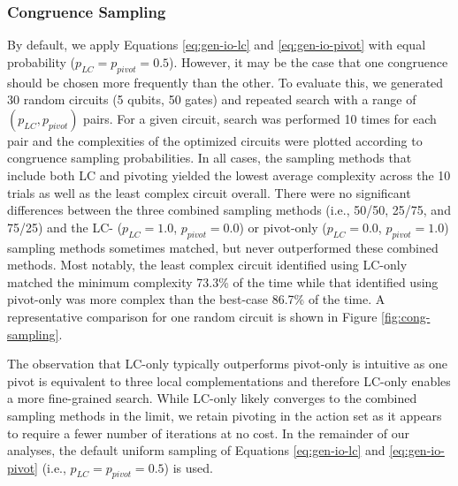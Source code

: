 \subsubsection*{Congruence Sampling}

By default, we apply Equations \ref{eq:gen-io-lc} and \ref{eq:gen-io-pivot} with equal probability ($p_{LC} = p_{pivot} = 0.5$).
However, it may be the case that one congruence should be chosen more frequently than the other.
To evaluate this, we generated 30 random circuits (5 qubits, 50 gates) and repeated search with a range of $(p_{LC}, p_{pivot})$ pairs.
For a given circuit, search was performed 10 times for each pair and the complexities of the optimized circuits were plotted according to congruence sampling probabilities.
In all cases, the sampling methods that include both LC and pivoting yielded the lowest average complexity across the 10 trials as well as the least complex circuit overall.
There were no significant differences between the three combined sampling methods (i.e., 50/50, 25/75, and 75/25) and the LC- ($p_{LC} = 1.0$, $p_{pivot} = 0.0$) or pivot-only ($p_{LC} = 0.0$, $p_{pivot} = 1.0$) sampling methods sometimes matched, but never outperformed these combined methods.
Most notably, the least complex circuit identified using LC-only matched the minimum complexity 73.3\% of the time while that identified using pivot-only was more complex than the best-case 86.7\% of the time.
A representative comparison for one random circuit is shown in Figure \ref{fig:cong-sampling}.

The observation that LC-only typically outperforms pivot-only is intuitive as one pivot is equivalent to three local complementations and therefore LC-only enables a more fine-grained search.
While LC-only likely converges to the combined sampling methods in the limit, we retain pivoting in the action set as it appears to require a fewer number of iterations at no cost.
In the remainder of our analyses, the default uniform sampling of Equations \ref{eq:gen-io-lc} and \ref{eq:gen-io-pivot} (i.e., $p_{LC} = p_{pivot} = 0.5$) is used.

